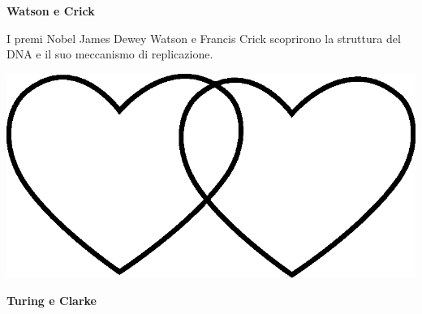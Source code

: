 \documentclass[11pt]{extarticle}
\begin{document}
\vspace*{\fill}
\newpage
\begin{center}
\vspace*{\fill}
{\Huge \textbf{Watson e Crick\\}}
\vspace*{\fill}
\end{center}
\newpage
{}
\vspace*{\fill}
\begin{center}
I premi Nobel James Dewey Watson e Francis Crick scoprirono la struttura del DNA e il suo meccanismo di replicazione.\\
\begin{center}
\includegraphics[scale=0.1]{img/cuori_venn.eps}\\
\end{center}
\end{center}
\vspace*{\fill}
\newpage
\begin{center}
\vspace*{\fill}
{\Huge \textbf{Turing e Clarke\\}}
\vspace*{\fill}
\end{center}
\newpage
{}
\vspace*{\fill}
\end{document}
